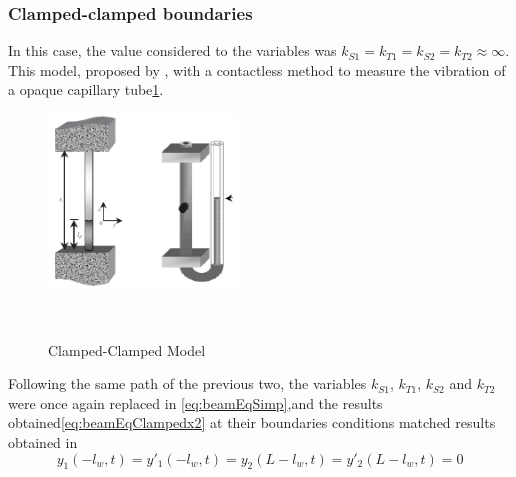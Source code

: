     \subsubsection{Clamped-clamped boundaries}
    In this case, the value considered to the variables was $k_{S1}=k_{T1}=k_{S2}=k_{T2}\approx\infty$. This model, proposed by \citeauthor{jacobsContactlessLiquidDetection2005}, with a contactless method to measure the vibration of a opaque capillary tube\ref{fig:clampedclampedmodel}.
    \begin{figure}[]
        \centering
        \includegraphics[width=0.45\textwidth]{Chapters/2CHP/Diagrams/clampedclampedmodel1.pdf}
        \caption{Clamped-Clamped Model}{~\cite{jacobsContactlessLiquidDetection2005}}
        \label{fig:clampedclampedmodel}
    \end{figure}
    Following the same path of the previous two, the variables $k_{S1}$, $k_{T1}$, $k_{S2}$ and $k_{T2}$ were once again replaced in \ref{eq:beamEqSimp},and the results obtained\ref{eq:beamEqClampedx2} at their boundaries conditions matched results obtained in~\cite{jacobsContactlessLiquidDetection2005}
    \begin{equation} \label{eq:beamEqClampedx2}
        y_1(-l_w,t) = y'_1(-l_w,t) = y_2(L-l_w,t) = y'_2(L-l_w,t)=0
    \end{equation}

